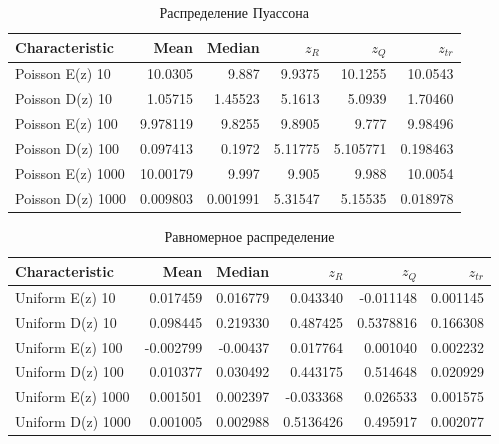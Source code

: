 \begin{table}[ht]
	\centering
	\begin{tabular}[t]{lrrrrr}
		\hline
		Characteristic    &      Mean &   Median &       $z_R$ &      $z_Q$ &     $z_{tr}$ \\
		\hline
		Poisson E(z) 10   & 10.0305   & 9.887  	 &  9.9375   & 10.1255  & 10.0543     \\
		Poisson D(z) 10   &  1.05715  & 1.45523  &  5.1613   & 5.0939   & 1.70460  \\
		Poisson E(z) 100  & 9.978119   & 9.8255   & 9.8905   & 9.777 & 9.98496  \\
		Poisson D(z) 100  &  0.097413 & 0.1972  &  5.11775 & 5.105771 & 0.198463 \\
		Poisson E(z) 1000 & 10.00179   & 9.997   & 9.905    & 9.988  & 10.0054 \\
		Poisson D(z) 1000 &  0.009803 & 0.001991 &  5.31547 & 5.15535 & 0.018978 \\
		\hline
	\end{tabular}
	
	\caption{Распределение Пуассона}
	\label{tab:poisson}
\end{table}

\begin{table}[ht]
	\centering
	\begin{tabular}[t]{lrrrrr}
		\hline
		Characteristic    &      Mean &    Median &       $z_{R}$ &       $z_Q$ &      $z_{tr}$ \\
		\hline
		Uniform E(z) 10   &  0.017459 &  0.016779 &  0.043340 &  -0.011148 &  0.001145 \\
		Uniform D(z) 10   &  0.098445 &  0.219330 &  0.487425 &  0.5378816 &  0.166308 \\
		Uniform E(z) 100  &  -0.002799 &  -0.00437 &  0.017764 &  0.001040 &  0.002232 \\
		Uniform D(z) 100  &  0.010377 &  0.030492 &  0.443175 &  0.514648 &  0.020929 \\
		Uniform E(z) 1000 & 0.001501 & 0.002397 & -0.033368  & 0.026533 & 0.001575  \\
		Uniform D(z) 1000 &  0.001005 &  0.002988 &  0.5136426   &  0.495917 &  0.002077 \\
		\hline
	\end{tabular}
	\caption{Равномерное распределение}
	\label{tab:uniform}
\end{table}


